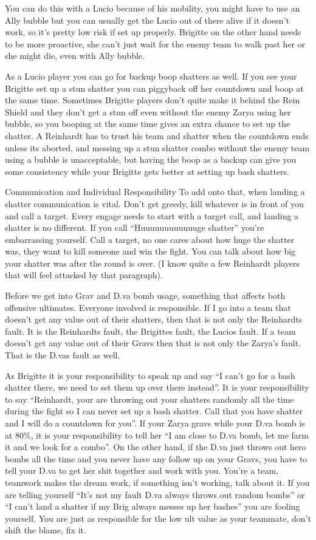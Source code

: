 You can do this with a Lucio because of his mobility, you might have to use an Ally bubble but you can usually get the Lucio out of there alive if it doesn’t work, so it’s pretty low risk if set up properly. Brigitte on the other hand needs to be more proactive, she can’t just wait for the enemy team to walk past her or she might die, even with Ally bubble.

As a Lucio player you can go for backup boop shatters as well. If you see your Brigitte set up a stun shatter you can piggyback off her countdown and boop at the same time. Sometimes Brigitte players don’t quite make it behind the Rein Shield and they don’t get a stun off even without the enemy Zarya using her bubble, so you booping at the same time gives an extra chance to set up the shatter.
A Reinhardt has to trust his team and shatter when the countdown ends unless its aborted, and messing up a stun shatter combo without the enemy team using a bubble is unacceptable, but having the boop as a backup can give you some consistency while your Brigitte gets better at setting up bash shatters.

Communication and Individual Responsibility
To add onto that, when landing a shatter communication is vital. Don’t get greedy, kill whatever is in front of you and call a target. Every engage needs to start with a target call, and landing a shatter is no different. If you call “Huuuuuuuuuuuuge shatter” you’re embarrassing yourself. Call a target, no one cares about how huge the shatter was, they want to kill someone and win the fight. You can talk about how big your shatter was after the round is over. (I know quite a few Reinhardt players that will feel attacked by that paragraph).

Before we get into Grav and D.va bomb usage, something that affects both offensive ultimates. Everyone involved is responsible. If I go into a team that doesn’t get any value out of their shatters, then that is not only the Reinhardts fault. It is the Reinhardts fault, the Brigittes fault, the Lucios fault. If a team doesn’t get any value out of their Gravs then that is not only the Zarya's fault. That is the D.vas fault as well.

As Brigitte it is your responsibility to speak up and say “I can’t go for a bash shatter there, we need to set them up over there instead”. It is your responsibility to say “Reinhardt, your are throwing out your shatters randomly all the time during the fight so I can never set up a bash shatter. Call that you have shatter and I will do a countdown for you”. If your Zarya gravs while your D.va bomb is at 80\%, it is your responsibility to tell her “I am close to D.va bomb, let me farm it and we look for a combo”. On the other hand, if the D.va just throws out hero bombs all the time and you never have any follow up on your Gravs, you have to tell your D.va to get her shit together and work with you. You’re a team, teamwork makes the dream work, if something isn’t working, talk about it.
If you are telling yourself “It’s not my fault D.va always throws out random bombs” or “I can’t land a shatter if my Brig always messes up her bashes” you are fooling yourself. You are just as responsible for the low ult value as your teammate, don’t shift the blame, fix it. 

